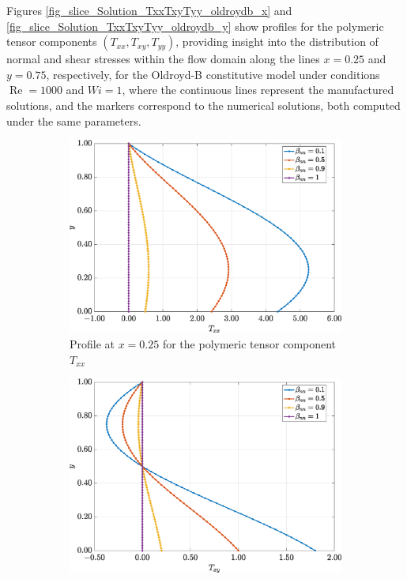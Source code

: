 \documentclass[preprint, 12pt]{elsarticle}
\begin{document}
Figures \ref{fig_slice_Solution_TxxTxyTyy_oldroydb_x} and \ref{fig_slice_Solution_TxxTxyTyy_oldroydb_y} show profiles for the polymeric tensor components $(T_{xx}, T_{xy}, T_{yy})$, providing insight into the distribution of normal and shear stresses within the flow domain along the lines $x=0.25$ and $y=0.75$, respectively, for the Oldroyd-B constitutive model under conditions $\operatorname{Re}=1000$ and \mbox{$Wi=1$}, where the continuous lines represent the manufactured solutions, and the markers correspond to the numerical solutions, both computed under the same parameters.
\begin{figure}[H]
    \centering  
    \begin{subfigure}[b]{.46\textwidth}
        \includegraphics[width=\textwidth]{Slice_x_Tog_Numerical_NormErr_2nd_Betann_1_Re_1000_Wi_1_epsilon_0_xi_0_alphaG_0_Dt_1e-06_at_0.05_tipsim_1_MMS_12_x0.25y0.25_Txx.eps}
        \caption{Profile at $x=0.25$ for the polymeric tensor component $T_{xx}$}
        \label{fig_slice_x_txx_2nd_Case1_oldroydB}
    \end{subfigure}
    \vspace{0.2cm}
    \qquad
    \begin{subfigure}[b]{.46\textwidth}
        \includegraphics[width=\textwidth]{Slice_x_Tog_Numerical_NormErr_2nd_Betann_1_Re_1000_Wi_1_epsilon_0_xi_0_alphaG_0_Dt_1e-06_at_0.05_tipsim_1_MMS_12_x0.25y0.25_Txy.eps}

\end{subfigure}
\end{figure}
\end{document}
